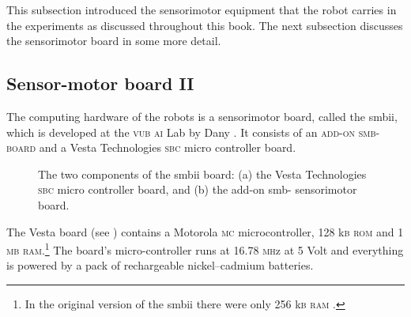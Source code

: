 \bigskip\noindent
This subsection introduced the sensorimotor equipment that the robot carries in the experiments as discussed throughout this book. The next subsection discusses the sensorimotor board in some more detail.

\subsection{Sensor-motor board II}\label{setup:smbii}


The computing hardware of the robots is a sensorimotor board, called the {\sc smbii}, which is developed at the {\scshape vub ai} Lab by Dany \citet{vereertbrugghen:1996}. It consists of an {\scshape add-on smb-{} board} and a Vesta Technologies {\scshape sbc}{} micro controller board.

\begin{figure}
\centering
{}
\caption{The two components of the {\sc smbii} board: (a) the Vesta Technologies {\scshape sbc}{} micro controller board, and (b) the add-on {\sc smb}-{} sensorimotor board.}
\end{figure}

The Vesta board (see ) contains a Motorola \textsc{mc}{} microcontroller, {128} {\footnotesize k}{\scshape b} {\scshape rom} and {1} {\scshape mb ram}.\footnote{In the original version of the {\sc smbii} there were only {256} {\scriptsize k}{\scshape b} {\scshape ram} \citep{vereertbrugghen:1996}.} The board's micro-controller runs at 16.78 {\scshape mh}{\footnotesize z} at 5 Volt and everything is powered by a pack of rechargeable nickel--cadmium batteries.

